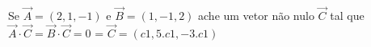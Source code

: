 \documentclass[a4paper,10pt]{article}
\begin{document}
 \subsubsection{}Se $\vec{A} = (2,1,-1)$ e $\vec{B} = (1,-1,2)$ ache um vetor não nulo $\vec{C}$  tal que 
 $\vec{A} \cdot \vec{C} = \vec{B} \cdot \vec{C} = 0$  = 
 $\vec{C} = (c1, 5.c1, -3.c1)$
 
 
 
\end{document}
